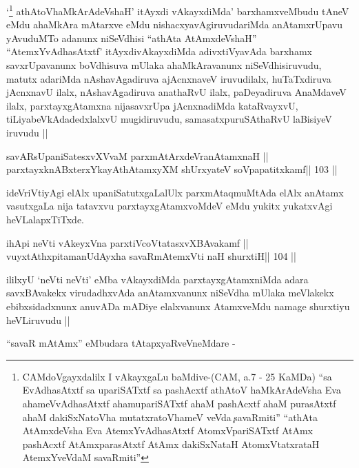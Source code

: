 \begin{artha}
`\footnote[1]{CAMdoVgayxdalilx I vAkayxgaLu baMdive-(CAM, a.7 - 25
    KaMDa) ``sa EvAdhasAtxtf sa upariSATxtf sa pashAcxtf athAtoV\s
    haMkArAdeVsha Eva ahameVvAdhasAtxtf ahamupariSATxtf ahaM pashAcxtf
  ahaM purasAtxtf ahaM dakiSxNatoV\s ha mutatxratoV\s hameV
  veVda\c\ savaRmiti'' ``athAta AtAmxdeVsha Eva AtemxYvAdhasAtxtf
  AtomxVpariSATxtf AtAmx pashAcxtf AtAmxparasAtxtf AtAmx dakiSxNataH
  AtomxVtatxrataH AtemxYveVdaM savaRmiti''}
athAtoV\s haMkArAdeVshaH' itAyxdi vAkayxdiMda'
  barxhamxveMbudu tAneV eMdu ahaMkAra mAtarxve eMdu
  nishacxyavAgiruvudariMda anAtamxrUpavu yAvuduMTo adanunx niSeVdhisi
  ``athAta AtAmxdeVshaH'' ``AtemxYvAdhasAtxtf' itAyxdivAkayxdiMda
  adivxtiVyavAda barxhamx savxrUpavanunx boVdhisuva mUlaka
  ahaMkAravanunx niSeVdhisiruvudu, matutx adariMda nAshavAgadiruva
  ajAcnxnaveV iruvudilalx, huTaTxdiruva jAcnxnavU ilalx,
  nAshavAgadiruva anathaRvU ilalx, paDeyadiruva AnaMdaveV ilalx,
  parxtayxgAtamxna nijasavxrUpa jAcnxnadiMda kataRvayxvU,
  tiLiyabeVkAdadedxlalxvU mugidiruvudu, samasatxpuruSAthaRvU laBisiyeV
  iruvudu ||
\end{artha}

\begin{shl}
savARsUpaniSatesxvXVvaM parxmAtArxdeVranAtamxnaH ||
parxtayxknABxterxYkayAthAtamxyXM shUrxyateV soVpapatitxkamf\hfill || 103 ||
\end{shl}

\begin{artha}
ideVriVtiyAgi elAlx upaniSatutxgaLalUlx parxmAtaqmuMtAda elAlx anAtamx
vasutxgaLa nija tatavxvu parxtayxgAtamxvoMdeV eMdu yukitx yukatxvAgi heVLalapxTiTxde.
\end{artha}

\begin{shl}
ihApi neVti vAkeyxVna parxtiVcoV\s tatasxvXBAvakamf ||
vuyxtAthxpitamanUdAyx\s\s ha savaRmAtemxVti naH shurxtiH\hfill || 104 ||
\end{shl}

\begin{artha}
ililxyU `neVti neVti' eMba vAkayxdiMda parxtayxgAtamxniMda adara
savxBAvakekx virudadhxvAda anAtamxvanunx niSeVdha mUlaka meVlakekx
ebibxsidadxnunx anuvADa mADiye elalxvanunx AtamxveMdu namage shurxtiyu
heVLiruvudu ||
\end{artha}

\begin{artha}
``savaR mAtAmx'' eMbudara tAtapxyaRveVneMdare -
\end{artha}

